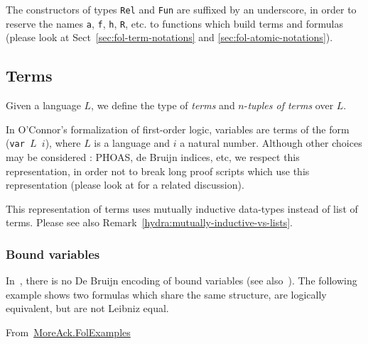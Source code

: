 \begin{remark}
  \label{rem:underscores}
  The constructors of types \texttt{Rel} and \texttt{Fun} are suffixed by an underscore, in order to reserve the names \texttt{a}, \texttt{f}, \texttt{h}, \texttt{R}, etc. to functions which build terms and formulas (please look at Sect~\ref{sec:fol-term-notations} and \ref{sec:fol-atomic-notations}).
\end{remark}


\subsection{Terms}

Given a language $L$, we define the type of \emph{terms} and
$n$-\emph{tuples of terms} over $L$.




\begin{remark}[Variables]
In O'Connor's formalization of first-order logic,  variables are \gallina terms of the form (\texttt{var $L$ $i$}), where $L$ is
 a language and $i$ a natural number. 
Although other choices may be considered : PHOAS, de Bruijn indices, etc,  we   respect this representation, in order not to break long proof scripts which use this representation (please look at \cite{OConnor05} for a related discussion).
  
\end{remark}

\begin{remark}
This representation of terms uses mutually inductive data-types instead of list of terms. Please see also Remark~\ref{hydra:mutually-inductive-vs-lists}.
\end{remark}


\subsubsection{Bound variables}

  In~\cite{Goedel}, there is no De Bruijn encoding of bound variables (see also~\cite{OConnor05}). The following example shows two formulas which share the same structure, are logically equivalent, but are not Leibniz equal.



\vspace{4pt}

\noindent From~\href{../theories/html/hydras.MoreAck.FolExamples.html}{MoreAck.FolExamples}
  
